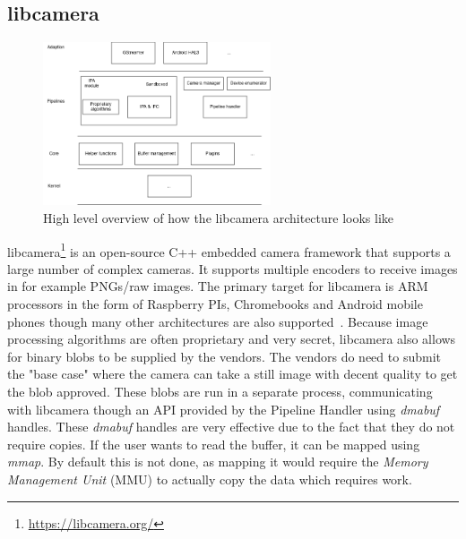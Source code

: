 \subsection{libcamera}\label{section:libcamera}
\begin{figure}
    \begin{center}
        \includegraphics[width=0.60\textwidth]{figures/libcameraarch.png}
    \end{center}
    \caption{High level overview of how the libcamera architecture looks like}
    \label{fig:libcameraarch}
\end{figure}

libcamera\footnote{\url{https://libcamera.org/}} is an open-source C++ embedded
camera framework that supports a large number of complex cameras.  It supports multiple encoders to receive
images in for example PNGs/raw images. The primary target for libcamera is ARM
processors in the form of Raspberry PIs, Chromebooks and Android mobile phones
though many other architectures are also supported~\cite{libcameraStack}.
Because image processing algorithms are often proprietary and very secret,
libcamera also allows for binary blobs to be supplied by the vendors. The
vendors do need to submit the "base case" where the camera can take a still
image with decent quality to get the blob approved. These blobs are run in a
separate process, communicating with libcamera though an API provided by the
Pipeline Handler using \textit{dmabuf} handles. These \textit{dmabuf} handles
are very effective due to the fact that they do not require copies. If the user
wants to read the buffer, it can be mapped using \textit{mmap}. By default this
is not done, as mapping it would require the \textit{Memory Management Unit}
(MMU) to actually copy the data which requires work.

